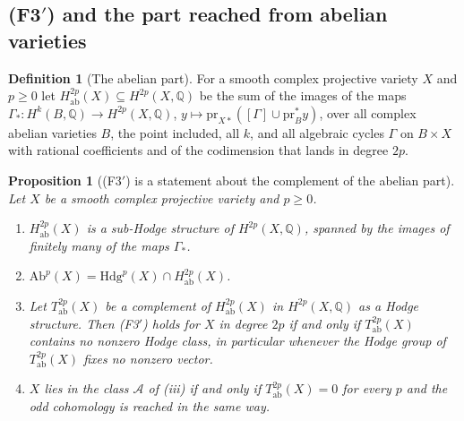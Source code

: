 \documentclass[11pt,reqno]{amsart}
\theoremstyle{plain}
\newtheorem{proposition}[theorem]{Proposition}
\theoremstyle{definition}
\newtheorem{definition}[theorem]{Definition}
\theoremstyle{remark}
\newcommand{\QQ}{\mathbb{Q}}
\newcommand{\Hdg}{\mathrm{Hdg}}
\begin{document}
\subsection{(F3$'$) and the part reached from abelian varieties}
\label{ssec:abpart}

\begin{definition}[The abelian part]\label{def:abpart}
For a smooth complex projective variety $X$ and $p\ge0$ let
$H^{2p}_{\mathrm{ab}}(X)\subseteq H^{2p}(X,\QQ)$ be the sum of the images of
the maps
$\Gamma_{*}\colon H^{k}(B,\QQ)\to H^{2p}(X,\QQ)$,
$y\mapsto\mathrm{pr}_{X*}([\Gamma]\cup\mathrm{pr}_{B}^{*}y)$, over all
complex abelian varieties $B$, the point included, all $k$, and all algebraic
cycles $\Gamma$ on $B\times X$ with rational coefficients and of the
codimension that lands in degree $2p$.
\end{definition}

\begin{proposition}[\textup{(F3$'$)} is a statement about the complement of
the abelian part]\label{prop:abpart}
Let $X$ be a smooth complex projective variety and $p\ge0$.
\begin{enumerate}[label=\textup{(\roman*)},leftmargin=2.6em,itemsep=2pt]
\item $H^{2p}_{\mathrm{ab}}(X)$ is a sub-Hodge structure of
  $H^{2p}(X,\QQ)$, spanned by the images of finitely many of the maps
  $\Gamma_{*}$.
\item $\mathrm{Ab}^{p}(X)=\Hdg^{p}(X)\cap H^{2p}_{\mathrm{ab}}(X)$.
\item Let $T^{2p}_{\mathrm{ab}}(X)$ be a complement of
  $H^{2p}_{\mathrm{ab}}(X)$ in $H^{2p}(X,\QQ)$ as a Hodge structure. Then
  \textup{(F3$'$)} holds for $X$ in degree $2p$ if and only if
  $T^{2p}_{\mathrm{ab}}(X)$ contains no nonzero Hodge class, in particular
  whenever the Hodge group of $T^{2p}_{\mathrm{ab}}(X)$ fixes no nonzero
  vector.
\item $X$ lies in the class $\mathcal{A}$ of (iii) if and
  only if $T^{2p}_{\mathrm{ab}}(X)=0$ for every $p$ and the odd cohomology is
  reached in the same way.
\end{enumerate}
\end{proposition}
\end{document}

